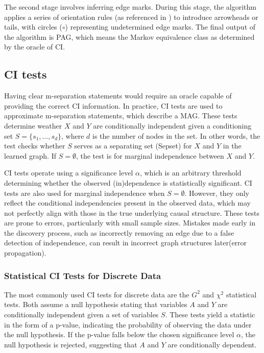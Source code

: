 \documentclass[main.tex]{subfiles}
\begin{document}
The second stage involves inferring edge marks. During this stage, the algorithm applies a series of orientation rules (as referenced in \cite{ZHANG20081873}) to introduce arrowheads or tails, with circles ($\circ$) representing undetermined edge marks. The final output of the algorithm is PAG, which means the Markov equivalence class as determined by the oracle of CI.

\subsection{CI tests}
Having clear m-separation statements would require an oracle capable of providing the correct CI information. In practice, CI tests are used to approximate m-separation statements, which describe a MAG. These tests determine weather \( X \) and \( Y \) are conditionally independent given a conditioning set \( S = \{s_1, \dots, s_d\} \), where \( d \) is the number of nodes in the set. In other words, the test checks whether \( S \) serves as a separating set (Sepset) for \( X \) and \( Y \) in the learned graph. If \( S = \emptyset \), the test is for marginal independence between \( X \) and \( Y \).

CI tests operate using a significance level \( \alpha \), which is an arbitrary threshold determining whether the observed (in)dependence is statistically significant. CI tests are also used for marginal independence when \( S = \emptyset \). However, they only reflect the conditional independencies present in the observed data, which may not perfectly align with those in the true underlying causal structure. These tests are prone to errors, particularly with small sample sizes. Mistakes made early in the discovery process, such as incorrectly removing an edge due to a false detection of independence, can result in incorrect graph structures later(error propagation).

\subsubsection*{Statistical CI Tests for Discrete Data}

The most commonly used CI tests for discrete data are the \( G^2 \) and \( \chi^2 \) statistical tests. Both assume a null hypothesis stating that variables \( A \) and \( Y \) are conditionally independent given a set of variables \( S \). These tests yield a statistic in the form of a p-value, indicating the probability of observing the data under the null hypothesis. If the p-value falls below the chosen significance level \( \alpha \), the null hypothesis is rejected, suggesting that \( A \) and \( Y \) are conditionally dependent.
\end{document}
